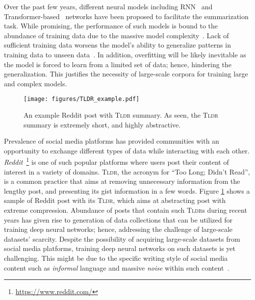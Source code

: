 \documentclass[11pt]{article}
\newcommand{\tldr}{\textsc{Tldr}}
\begin{document}
Over the past few years, different neural models including RNN~\cite{Hochreiter1997LongSM} and Transformer-based~\cite{Vaswani2017AttentionIA} networks have been proposed to facilitate the summarization task. While promising, the performance of such models is bound to the abundance of training data due to the massive model complexity~\cite{Ying_2019}. Lack of sufficient training data worsens the model's ability to generalize patterns in training data to unseen data~\cite{Althnian2021ImpactOD}. In addition, overfitting will be likely inevitable as the model is forced to learn from a limited set of data; hence, hindering the generalization. This justifies the necessity of large-scale corpora for training large and complex models. 

\begin{figure}
    \centering
    \texttt{[image: figures/TLDR\_example.pdf]}
    \caption{An example Reddit post with \tldr{} summary. As seen, the \tldr{} summary is extremely short, and highly abstractive.}
    \label{fig:tldr_example}
\end{figure}


Prevalence of social media platforms has provided communities with an opportunity to exchange different types of data while interacting with each other. \textit{Reddit}~\footnote{\url{https://www.reddit.com/}} is one of such popular platforms where users post their content of interest in a variety of domains. \tldr , the acronym for ``Too Long; Didn't Read'', is a common practice that aims at removing unnecessary information from the lengthy post, and presenting its gist information in a few words. Figure \ref{fig:tldr_example} shows a sample of Reddit post with its \tldr , which aims at abstracting post with extreme compression. Abundance of posts that contain such \tldr s during recent years has given rise to generation of data collections that can be utilized for training deep neural networks; hence, addressing the challenge of large-scale datasets' scarcity. Despite the possibility of acquiring large-scale datasets from social media platforms, training deep neural networks on such datasets is yet challenging. This might be due to the specific writing style of social media content such as \textit{informal} language and massive \textit{noise} within such content~\cite{Sotudeh2020GUIRAS}.
\end{document}
